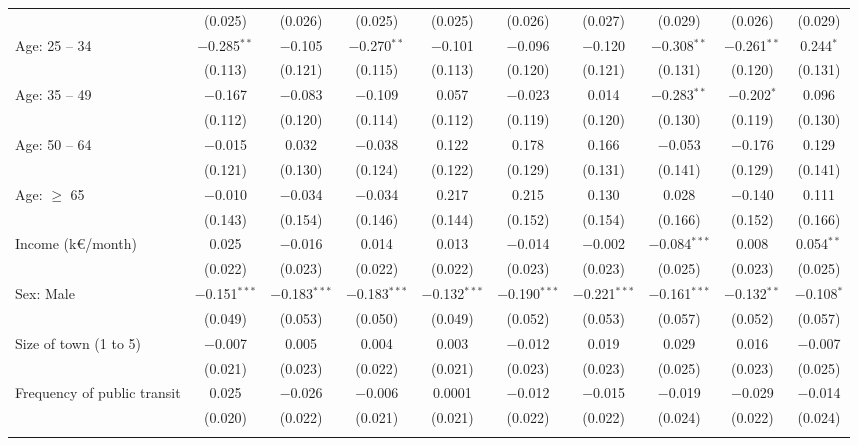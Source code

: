 \documentclass[11pt]{article}
\begin{document}
\begin{table}[!htbp]
{\begin{tabular}{@{\extracolsep{5pt}}lccccccccc}
  & (0.025) & (0.026) & (0.025) & (0.025) & (0.026) & (0.027) & (0.029) & (0.026) & (0.029) \\ 
  Age: 25 -- 34 & $-$0.285$^{**}$ & $-$0.105 & $-$0.270$^{**}$ & $-$0.101 & $-$0.096 & $-$0.120 & $-$0.308$^{**}$ & $-$0.261$^{**}$ & 0.244$^{*}$ \\ 
  & (0.113) & (0.121) & (0.115) & (0.113) & (0.120) & (0.121) & (0.131) & (0.120) & (0.131) \\ 
  Age: 35 -- 49 & $-$0.167 & $-$0.083 & $-$0.109 & 0.057 & $-$0.023 & 0.014 & $-$0.283$^{**}$ & $-$0.202$^{*}$ & 0.096 \\ 
  & (0.112) & (0.120) & (0.114) & (0.112) & (0.119) & (0.120) & (0.130) & (0.119) & (0.130) \\ 
  Age: 50 -- 64 & $-$0.015 & 0.032 & $-$0.038 & 0.122 & 0.178 & 0.166 & $-$0.053 & $-$0.176 & 0.129 \\ 
  & (0.121) & (0.130) & (0.124) & (0.122) & (0.129) & (0.131) & (0.141) & (0.129) & (0.141) \\ 
  Age: $\geq$ 65 & $-$0.010 & $-$0.034 & $-$0.034 & 0.217 & 0.215 & 0.130 & 0.028 & $-$0.140 & 0.111 \\ 
  & (0.143) & (0.154) & (0.146) & (0.144) & (0.152) & (0.154) & (0.166) & (0.152) & (0.166) \\ 
  Income (k\euro{}/month) & 0.025 & $-$0.016 & 0.014 & 0.013 & $-$0.014 & $-$0.002 & $-$0.084$^{***}$ & 0.008 & 0.054$^{**}$ \\ 
  & (0.022) & (0.023) & (0.022) & (0.022) & (0.023) & (0.023) & (0.025) & (0.023) & (0.025) \\ 
  Sex: Male & $-$0.151$^{***}$ & $-$0.183$^{***}$ & $-$0.183$^{***}$ & $-$0.132$^{***}$ & $-$0.190$^{***}$ & $-$0.221$^{***}$ & $-$0.161$^{***}$ & $-$0.132$^{**}$ & $-$0.108$^{*}$ \\ 
  & (0.049) & (0.053) & (0.050) & (0.049) & (0.052) & (0.053) & (0.057) & (0.052) & (0.057) \\ 
  Size of town (1 to 5) & $-$0.007 & 0.005 & 0.004 & 0.003 & $-$0.012 & 0.019 & 0.029 & 0.016 & $-$0.007 \\ 
  & (0.021) & (0.023) & (0.022) & (0.021) & (0.023) & (0.023) & (0.025) & (0.023) & (0.025) \\ 
  Frequency of public transit & 0.025 & $-$0.026 & $-$0.006 & 0.0001 & $-$0.012 & $-$0.015 & $-$0.019 & $-$0.029 & $-$0.014 \\ 
  & (0.020) & (0.022) & (0.021) & (0.021) & (0.022) & (0.022) & (0.024) & (0.022) & (0.024) \\ 
 \hline \\[-1.8ex] 

\end{tabular}}
\end{table}
\end{document}
